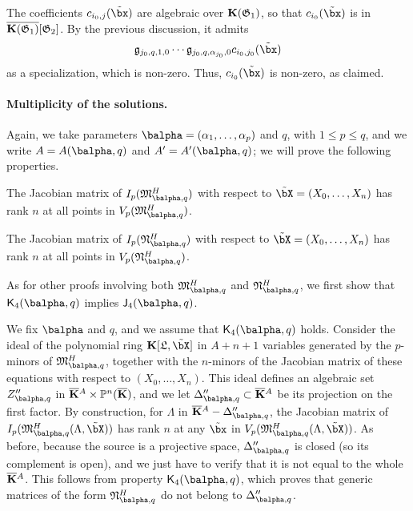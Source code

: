 \documentclass[12pt]{article}
\begin{document}
The coefficients $c_{i_0,j}(\tilde\bx)$ are algebraic over
$\mathbf{K}(\mathfrak{G}_1)$, so that $c_{i_0}(\tilde\bx)$ is in
$\overline{\mathbf{K}(\mathfrak{G}_1)}[\mathfrak{G}_2]$. By the previous 
discussion, it admits
$$ \mathfrak{g}_{j_0,q,1,0}\cdots \mathfrak{g}_{j_0,q,\alpha_{j_0},0} c_{i_0,j_0}(\tilde\bx)$$ as a
specialization, which is non-zero. Thus,  $c_{i_0}(\tilde\bx)$ 
is non-zero, as claimed.

\paragraph{Multiplicity of the solutions.} 
Again, we take parameters $\balpha=(\alpha_1,\dots,\alpha_p)$ and $q$,
with $1 \le p \le q$, and we write $A=A(\balpha,q)$ and
$A'=A'(\balpha,q)$; we will prove the following properties.
\begin{description}[leftmargin=*]
\item[$\assI_4(\balpha,q).$] The Jacobian matrix of
  $I_p(\mathfrak{M}^H_{\balpha,q})$ with respect to
  $\tilde\bX=(X_0,\dots,X_n)$ has rank $n$ at all points in
  $V_p(\mathfrak{M}^H_{\balpha,q})$.
\item[$\assJ_4(\balpha,q).$] The Jacobian matrix of
  $I_p(\mathfrak{N}^H_{\balpha,q})$ with respect to
  $\tilde\bX=(X_0,\dots,X_n)$ has rank $n$ at all points in
  $V_p(\mathfrak{N}^H_{\balpha,q})$.
\end{description}
As for other proofs involving both $\mathfrak{M}^H_{\balpha,q}$ and
$\mathfrak{N}^H_{\balpha,q}$, we first show that $\assJ_4(\balpha,q)$
implies $\assI_4(\balpha,q)$.

We fix $\balpha$ and $q$, and we assume that $\assJ_4(\balpha,q)$
holds. Consider the ideal of the polynomial ring
$\KK[\mathfrak{L},\tilde\bX]$ in $A+n+1$ variables generated by the
$p$-minors of $\mathfrak{M}^H_{\balpha,q}$, together with the
$n$-minors of the Jacobian matrix of these equations with respect to
$(X_0,\dots,X_n)$. This ideal defines an algebraic set
$Z''_{\balpha,q}$ in $\overline{\mathbf{K}}{}^A \times \mathbb{P}^n(\overline{\mathbf{K}})$, and we let
$\Delta''_{\balpha,q} \subset \KKbar{}^A$ be its projection on the
first factor. By construction, for $\Lambda$ in
$\KKbar{}^A-\Delta''_{\balpha,q}$, the Jacobian matrix of
$I_p(\mathfrak{M}^H_{\balpha,q}(\Lambda,\tilde\bX))$ has rank $n$ at
any $\tilde\bx$ in
$V_p(\mathfrak{M}^H_{\balpha,q}(\Lambda,\tilde\bX))$. As before,
because the source is a projective space, $\Delta''_{\balpha,q}$ is closed
(so its complement is open), and we just have to verify that it is not
equal to the whole $\overline{\mathbf{K}}{}^A$. This follows from property
$\assJ_4(\balpha,q)$, which proves that generic matrices of the form
$\mathfrak{N}^H_{\balpha,q}$ do not belong to $\Delta''_{\balpha,q}$.
\end{document}
